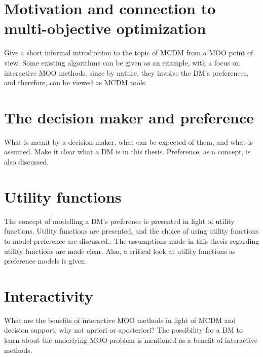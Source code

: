 \section{Motivation and connection to multi-objective optimization}
{\color{red}
Give a short informal introduction to the topic of MCDM from a MOO point of view.
Some existing algorithms can be given as an example, with a focus on interactive MOO methods, since by nature, 
they involve the DM's preferences, and therefore, can be viewed as MCDM tools.
}
\section{The decision maker and preference}
{\color{red}
What is meant by a decision maker, what can be expected of them, and what is assumed. Make it clear what a DM is in this thesis. Preference, as a concept, is also
discussed.
}
\section{Utility functions}
{\color{red}
The concept of modelling a DM's preference is presented in light of utility functions. Utility functions are presented, and the choice of
using utility functions to model preference are discussed..
The assumptions made in this thesis regarding utility functions are made clear. Also, a critical look at utility functions as preference models is given.
}
\section{Interactivity}
{\color{red}
What are the benefits of interactive MOO methods in light of MCDM and decision support, why not apriori or aposteriori?
The possibility for a DM to learn about the underlying MOO problem is mentioned as a benefit of interactive methods.
}